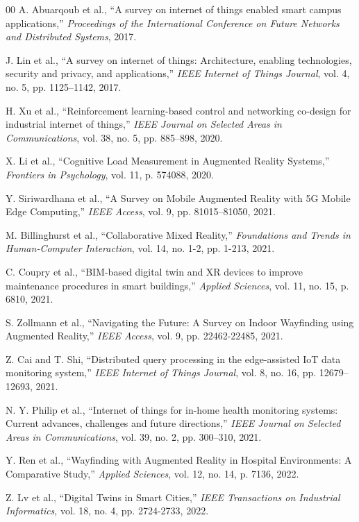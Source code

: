 \documentclass[conference]{IEEEtran}
\begin{document}
\begin{thebibliography}{00}
 A. Abuarqoub et al., ``A survey on internet of things enabled smart campus applications,'' \textit{Proceedings of the International Conference on Future Networks and Distributed Systems}, 2017.

 J. Lin et al., ``A survey on internet of things: Architecture, enabling technologies, security and privacy, and applications,'' \textit{IEEE Internet of Things Journal}, vol. 4, no. 5, pp. 1125--1142, 2017.

 H. Xu et al., ``Reinforcement learning-based control and networking co-design for industrial internet of things,'' \textit{IEEE Journal on Selected Areas in Communications}, vol. 38, no. 5, pp. 885--898, 2020.

 X. Li et al., ``Cognitive Load Measurement in Augmented Reality Systems,'' \textit{Frontiers in Psychology}, vol. 11, p. 574088, 2020.

 Y. Siriwardhana et al., ``A Survey on Mobile Augmented Reality with 5G Mobile Edge Computing,'' \textit{IEEE Access}, vol. 9, pp. 81015--81050, 2021.

 M. Billinghurst et al., ``Collaborative Mixed Reality,'' \textit{Foundations and Trends in Human-Computer Interaction}, vol. 14, no. 1-2, pp. 1-213, 2021.

 C. Coupry et al., ``BIM-based digital twin and XR devices to improve maintenance procedures in smart buildings,'' \textit{Applied Sciences}, vol. 11, no. 15, p. 6810, 2021.

 S. Zollmann et al., ``Navigating the Future: A Survey on Indoor Wayfinding using Augmented Reality,'' \textit{IEEE Access}, vol. 9, pp. 22462-22485, 2021.

 Z. Cai and T. Shi, ``Distributed query processing in the edge-assisted IoT data monitoring system,'' \textit{IEEE Internet of Things Journal}, vol. 8, no. 16, pp. 12679--12693, 2021.

 N. Y. Philip et al., ``Internet of things for in-home health monitoring systems: Current advances, challenges and future directions,'' \textit{IEEE Journal on Selected Areas in Communications}, vol. 39, no. 2, pp. 300--310, 2021.

 Y. Ren et al., ``Wayfinding with Augmented Reality in Hospital Environments: A Comparative Study,'' \textit{Applied Sciences}, vol. 12, no. 14, p. 7136, 2022.

 Z. Lv et al., ``Digital Twins in Smart Cities,'' \textit{IEEE Transactions on Industrial Informatics}, vol. 18, no. 4, pp. 2724-2733, 2022.


\end{thebibliography}
\end{document}
